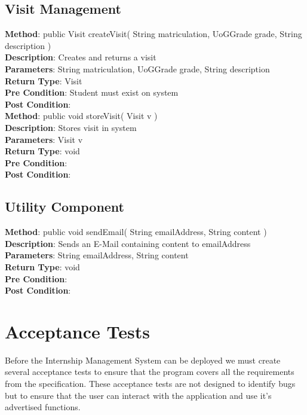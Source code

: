 \documentclass{l3deliverable}
\begin{document}
\subsection{Visit Management}
\textbf{Method}: public Visit createVisit( String matriculation, UoGGrade grade, String description )\\
\textbf{Description}: Creates and returns a visit\\
\textbf{Parameters}: String matriculation, UoGGrade grade, String description\\
\textbf{Return Type}: Visit\\
\textbf{Pre Condition}: Student must exist on system\\
\textbf{Post Condition}:\\

\textbf{Method}: public void storeVisit( Visit v )\\
\textbf{Description}: Stores visit in system\\
\textbf{Parameters}: Visit v\\
\textbf{Return Type}: void\\
\textbf{Pre Condition}:\\
\textbf{Post Condition}:\\

\subsection{Utility Component}
\textbf{Method}: public void sendEmail( String emailAddress, String content ) \\
\textbf{Description}: Sends an E-Mail containing content to emailAddress\\
\textbf{Parameters}: String emailAddress, String content\\
\textbf{Return Type}: void\\
\textbf{Pre Condition}:\\
\textbf{Post Condition}:\\




\section{Acceptance Tests}

Before the Internship Management System can be deployed we must create
several acceptance tests to ensure that the program covers all the
requirements from the specification. These acceptance tests are not
designed to identify bugs but to ensure that the user can interact
with the application and use it's advertised functions.\\
\end{document}
